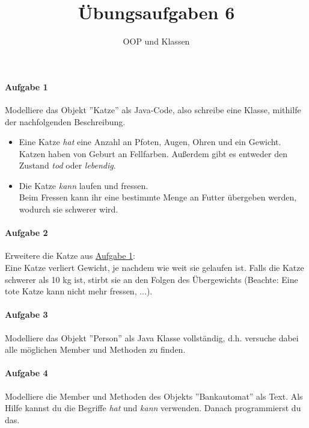 \documentclass[12pt,a4paper,ngerman]{scrartcl}
\title{Übungsaufgaben 6}
\subtitle{OOP und Klassen}
\date{}
\begin{document}
	\maketitle
	
	\paragraph{Aufgabe 1}\mbox{}
	\label{A1}
	Modelliere das Objekt ''Katze'' als Java-Code, also schreibe eine Klasse, mithilfe der nachfolgenden Beschreibung.
	\begin{itemize}
		\item[] Eine Katze \emph{hat} eine Anzahl an Pfoten, Augen, Ohren und ein Gewicht. 	
				Katzen haben von Geburt an Fellfarben.
				Außerdem gibt es entweder den Zustand \emph{tod} oder \emph{lebendig}.
		
		\item[]	Die Katze \emph{kann} laufen und fressen.\\
				Beim Fressen kann ihr eine bestimmte Menge an Futter übergeben werden, wodurch sie schwerer wird.
	\end{itemize}
	
	\paragraph{Aufgabe 2}\mbox{}
	Erweitere die Katze aus \hyperref[A1]{Aufgabe 1}:\\
	Eine Katze verliert Gewicht, je nachdem wie weit sie gelaufen ist.
	Falls die Katze schwerer als 10 kg ist, stirbt sie an den Folgen des Übergewichts (Beachte: Eine tote Katze kann nicht mehr fressen, ...).
	
	\paragraph{Aufgabe 3}\mbox{}
	Modelliere das Objekt ''Person'' als Java Klasse vollständig, d.h. versuche dabei alle möglichen Member und Methoden zu finden.
	
	\paragraph{Aufgabe 4}\mbox{}
	Modelliere die Member und Methoden des Objekts ''Bankautomat'' als Text. Als Hilfe kannst du die Begriffe \emph{hat} und \emph{kann} verwenden. Danach programmierst du das.
\end{document}

